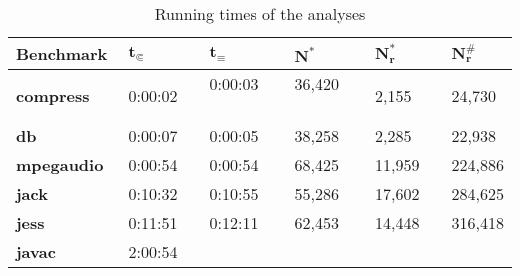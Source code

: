 \begin{table}[h]
\caption{Running times of the analyses}\label{tab:runtimes}
\centering
\begin{tabular}{@{}llllll@{}}
\toprule
\textbf{Benchmark} & $\bm{t_{\Subset}}$ & $\bm{t_\equiv}$ & $\bm{N^*}$ & $\bm{N^*_r}$ & $\bm{N^\#_r}$ \\ \midrule
\textbf{compress}  & 0:00:02\ \                    & 0:00:03 \ \                  & 36,420 \ \              & 2,155                  & 24,730                     \\
\textbf{db}        & 0:00:07                       & 0:00:05                      & 38,258                  & 2,285                     & 22,938                     \\
\textbf{mpegaudio\ } & 0:00:54                       & 0:00:54                      & 68,425                  & 11,959                    & 224,886                    \\
\textbf{jack}      & 0:10:32                       & 0:10:55                      & 55,286                  & 17,602\ \                 & 284,625                    \\
\textbf{jess}      & 0:11:51                       & 0:12:11                      & 62,453                  & 14,448                    & 316,418                    \\
\textbf{javac}     & 2:00:54                       &                              &                         &                           &                            \\ \bottomrule
\end{tabular}
\end{table}